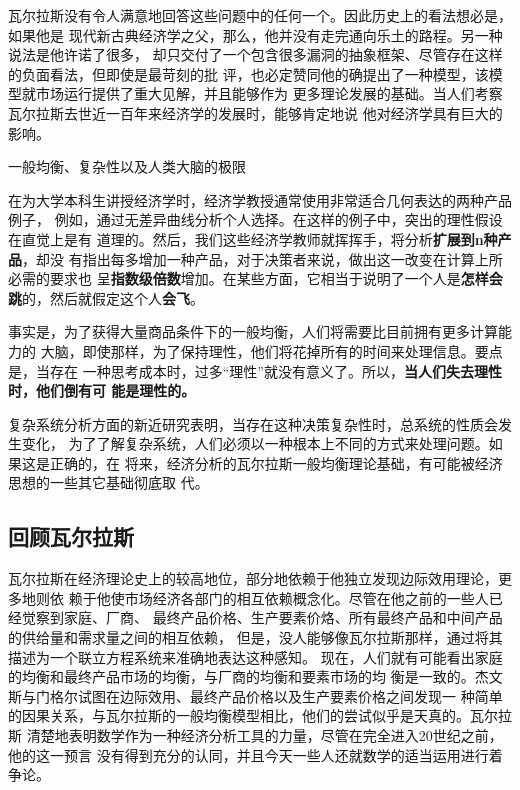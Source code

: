 瓦尔拉斯没有令人满意地回答这些问题中的任何一个。因此历史上的看法想必是，如果他是
现代新古典经济学之父，那么，他并没有走完通向乐土的路程。另一种说法是他许诺了很多，
却只交付了一个包含很多漏洞的抽象框架、尽管存在这样的负面看法，但即使是最苛刻的批
评，也必定赞同他的确提出了一种模型，该模型就市场运行提供了重大见解，并且能够作为
更多理论发展的基础。当人们考察瓦尔拉斯去世近一百年来经济学的发展时，能够肯定地说
他对经济学具有巨大的影响。

\begin{mybox}{一般均衡、复杂性以及人类大脑的极限}
  \begin{multicols}{2}
    在为大学本科生讲授经济学时，经济学教授通常使用非常适合几何表达的两种产品例子，
    例如，通过无差异曲线分析个人选择。在这样的例子中，突出的理性假设在直觉上是有
    道理的。然后，我们这些经济学教师就挥挥手，将分析\textbf{扩展到n种产品}，却没
    有指出每多增加一种产品，对于决策者来说，做出这一改变在计算上所必需的要求也
    呈\textbf{指数级倍数}增加。在某些方面，它相当于说明了一个人是\textbf{怎样会
      跳}的，然后就假定这个人\textbf{会飞}。

    事实是，为了获得大量商品条件下的一般均衡，人们将需要比目前拥有更多计算能力的
    大脑，即使那样，为了保持理性，他们将花掉所有的时间来处理信息。要点是，当存在
    一种思考成本时，过多“理性”就没有意义了。所以，\textbf{当人们失去理性时，他们倒有可
    能是理性的。}

  复杂系统分析方面的新近研究表明，当存在这种决策复杂性时，总系统的性质会发生变化，
  为了了解复杂系统，人们必须以一种根本上不同的方式来处理问题。如果这是正确的，在
  将来，经济分析的瓦尔拉斯一般均衡理论基础，有可能被经济思想的一些其它基础彻底取
  代。
  \end{multicols}
\end{mybox}

\subsection{回顾瓦尔拉斯}

瓦尔拉斯在经济理论史上的较高地位，部分地依赖于他独立发现边际效用理论，更多地则依
赖于他使市场经济各部门的相互依赖概念化。尽管在他之前的一些人已经觉察到家庭、厂商、
最终产品价格、生产要素价烙、所有最终产品和中间产品的供给量和需求量之间的相互依赖，
但是，没人能够像瓦尔拉斯那样，通过将其描述为一个联立方程系统来准确地表达这种感知。
现在，人们就有可能看出家庭的均衡和最终产品市场的均衡，与厂商的均衡和要素市场的均
衡是一致的。杰文斯与门格尔试图在边际效用、最终产品价格以及生产要素价格之间发现一
种简单的因果关系，与瓦尔拉斯的一般均衡模型相比，他们的尝试似乎是天真的。瓦尔拉斯
清楚地表明数学作为一种经济分析工具的力量，尽管在完全进入20世纪之前，他的这一预言
没有得到充分的认同，并且今天一些人还就数学的适当运用进行着争论。

